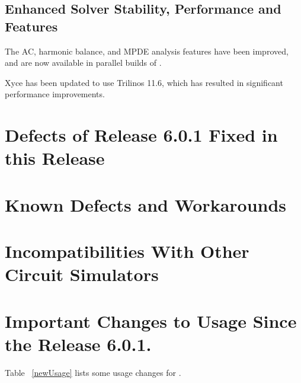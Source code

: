 \documentclass[11pt,report,strict]{SANDreport}
\begin{document}
\subsection{Enhanced Solver Stability, Performance and Features}
\begin{XyceItemize}
\item The AC, harmonic balance, and MPDE analysis features have been improved, and are now available in parallel builds of \Xyce{}.
\item Xyce has been updated to use Trilinos 11.6, which has resulted in significant performance improvements.
\end{XyceItemize}


\newpage
\section{Defects of Release 6.0.1 Fixed in this Release}


\newpage

\section{Known Defects and Workarounds}

\newpage

\section{Incompatibilities With Other Circuit Simulators}


\newpage
\section{Important Changes to \Xyce{} Usage Since the Release 6.0.1.}
Table ~\ref{newUsage} lists some usage changes for \Xyce{}.


\clearpage

\begin{SANDdistribution}[NM]%

    \bigskip



\end{SANDdistribution}
\end{document}
